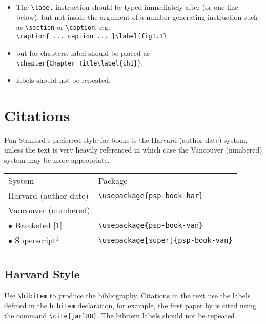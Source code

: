 \begin{itemize}
\item The \verb|\label| instruction should be typed
immediately after (or one line below), but not inside the argument of
a number-generating instruction such as \verb|\section| or \verb|\caption|, e.g.\\
\verb|\caption{ ... caption ... }\label{fig1.1}|
\item but for chapters, label should be placed as\\
    \verb|\chapter{Chapter Title\label{ch1}}|.
\item labels should not be repeated.
\end{itemize}

\section{Citations}

Pan Stanford's preferred style for books is the Harvard
(author-date) system, unless the text is very heavily referenced in
which case the Vancouver (numbered) system may be more appropriate.

\begin{center}
\tablefont
\begin{tabular}{@{}ll@{}}\toprule
System & Package\\\colrule
 Harvard (author-date) & \verb|\usepackage{psp-book-har}|\\
 Vancouver (numbered)\\
 \quad$\bullet$ Bracketed [1] & \verb|\usepackage{psp-book-van}|\\
 \quad$\bullet$ Superscript$^1$ & \verb|\usepackage[super]{psp-book-van}|\\\botrule
\end{tabular}
\end{center}

\subsection{Harvard Style}

Use \verb|\bibitem| to produce the bibliography.  Citations in the
text use the labels defined in the \verb|bibitem| declaration, for example,
the first paper by \cite{jarl88} is cited using the command
\verb|\cite{jarl88}|. The bibitem labels should not be repeated.

